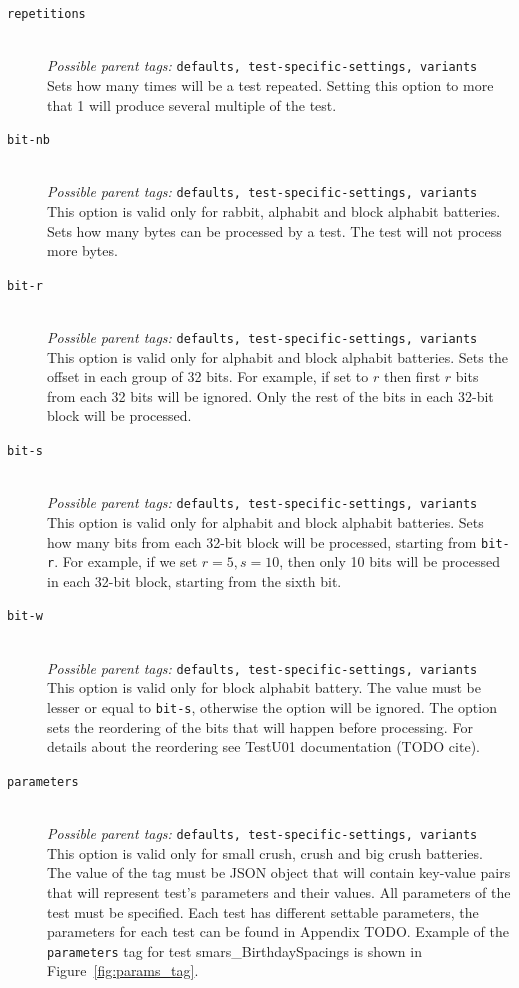 \documentclass[
  digital,  	%
  color,		%
  oneside,   	%
  12pt,
  nocover,
  notable,
  nolof,
  nolot,
]{fithesis3}
\begin{document}
\begin{description}
\item[\texttt{repetitions}] \hfill \\
\textit{Possible parent tags: } \texttt{defaults, test-specific-settings, variants} \\
Sets how many times will be a test repeated. Setting this option to more that 1 will produce several multiple of the test.

\item[\texttt{bit-nb}] \hfill \\
\textit{Possible parent tags: } \texttt{defaults, test-specific-settings, variants} \\
This option is valid only for rabbit, alphabit and block alphabit batteries. Sets how many bytes can be processed by a test. The test will not process more bytes.

\item[\texttt{bit-r}] \hfill \\
\textit{Possible parent tags: } \texttt{defaults, test-specific-settings, variants} \\
This option is valid only for alphabit and block alphabit batteries. Sets the offset in each group of 32 bits. For example, if set to $r$ then first $r$ bits from each 32 bits will be ignored. Only the rest of the bits in each 32-bit block will be processed.

\item[\texttt{bit-s}] \hfill \\
\textit{Possible parent tags: } \texttt{defaults, test-specific-settings, variants} \\
This option is valid only for alphabit and block alphabit batteries. Sets how many bits from each 32-bit block will be processed, starting from \texttt{bit-r}. For example, if we set $r=5, s=10$, then only 10 bits will be processed in each 32-bit block, starting from the sixth bit.

\item[\texttt{bit-w}] \hfill \\
\textit{Possible parent tags: } \texttt{defaults, test-specific-settings, variants} \\
This option is valid only for block alphabit battery. The value must be lesser or equal to \texttt{bit-s}, otherwise the option will be ignored. The option sets the reordering of the bits that will happen before processing. For details about the reordering see TestU01 documentation (TODO cite).

\item[\texttt{parameters}] \hfill \\
\textit{Possible parent tags: } \texttt{defaults, test-specific-settings, variants} \\
This option is valid only for small crush, crush and big crush batteries. The value of the tag must be JSON object that will contain key-value pairs that will represent test's parameters and their values. All parameters of the test must be specified. Each test has different settable parameters, the parameters for each test can be found in Appendix TODO. Example of the \texttt{parameters} tag for test smars\_BirthdaySpacings is shown in Figure~\ref{fig:params_tag}.


\end{description}
\end{document}
